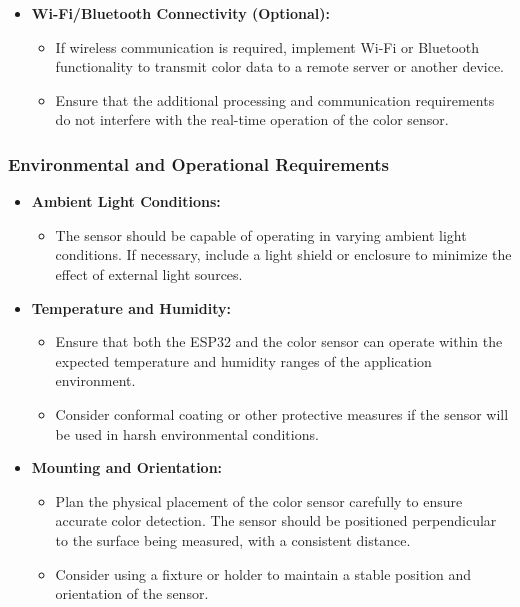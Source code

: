 \begin{itemize}
	\item \textbf{Wi-Fi/Bluetooth Connectivity (Optional):}
	\begin{itemize}
		\item If wireless communication is required, implement Wi-Fi or Bluetooth functionality to transmit color data to a remote server or another device.
		\item Ensure that the additional processing and communication requirements do not interfere with the real-time operation of the color sensor.
	\end{itemize}
\end{itemize}

\subsubsection*{Environmental and Operational Requirements}

\begin{itemize}
	\item \textbf{Ambient Light Conditions:}
	\begin{itemize}
		\item The sensor should be capable of operating in varying ambient light conditions. If necessary, include a light shield or enclosure to minimize the effect of external light sources.
	\end{itemize}
	
	\item \textbf{Temperature and Humidity:}
	\begin{itemize}
		\item Ensure that both the ESP32 and the color sensor can operate within the expected temperature and humidity ranges of the application environment.
		\item Consider conformal coating or other protective measures if the sensor will be used in harsh environmental conditions.
	\end{itemize}
	
	\item \textbf{Mounting and Orientation:}
	\begin{itemize}
		\item Plan the physical placement of the color sensor carefully to ensure accurate color detection. The sensor should be positioned perpendicular to the surface being measured, with a consistent distance.
		\item Consider using a fixture or holder to maintain a stable position and orientation of the sensor.
	\end{itemize}
\end{itemize}

